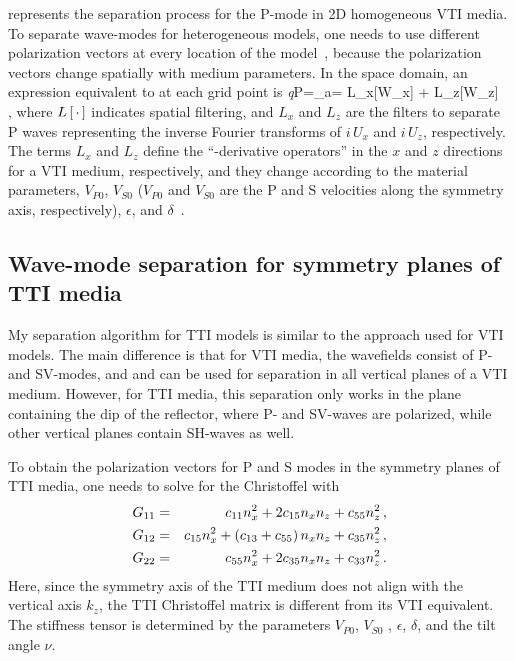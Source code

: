  represents the separation process for the 
P-mode in 2D homogeneous VTI media. To separate wave-modes for
heterogeneous models, one needs to use different polarization vectors at every
location of the model~\cite[]{yan:WB19}, because the polarization
vectors change spatially with medium parameters.  In the space domain,
an expression equivalent to  at each grid point is
\beq\label{AniDivX}
{\it q}P=\nabla_a\cdot \WW     = L_x[W_x] + L_z[W_z] \, ,
\eeq
where $L\left [\,\cdot\,\right]$ indicates spatial filtering, and $L_x$ and $L_z$
are the filters to separate P waves representing the inverse Fourier
transforms of $i\, U_x$ and $i\, U_z$, respectively. The terms $L_x$
and $L_z$ define the ``\cool-derivative operators'' in the $x$ and $z$
directions for a VTI medium, respectively, and they change according to the material
parameters, $V_{P0}$, $V_{S0}$ ($V_{P0}$ and $V_{S0}$ are the P and S
velocities along the symmetry axis, respectively), $\epsilon$, and
$\delta$~\cite[]{thomsen:1954}.

\subsection{Wave-mode separation for symmetry planes of TTI media}
My separation algorithm for TTI models is similar to the approach
used for VTI models.  The main difference is that for VTI media, the
wavefields consist of P- and SV-modes, and 
and  can be used for separation in all vertical planes of
a VTI medium. However, for TTI media, this separation only works in
the plane containing the dip of the reflector, where P- and SV-waves are
polarized, while other vertical planes contain SH-waves as well.


To obtain the polarization vectors for P and S modes in the symmetry
planes of TTI media, one needs to solve for the Christoffel 
with 
\begin{eqnarray}
G_{11}&=&c_{11} n_x^2 +2c_{15}n_xn_z+c_{55} n_z^2 \, ,\\
G_{12}&=&c_{15} n_x^2+\left ( c_{13}+c_{55}\right) n_xn_z+c_{35} n_z^2\, ,\\
G_{22}&=&c_{55} n_x^2 +2c_{35}n_xn_z+c_{33} n_z^2\, .
\end{eqnarray}
Here, since the symmetry axis of the TTI medium does not align with
the vertical axis $k_z$, the TTI Christoffel matrix is different from
its VTI equivalent. The stiffness tensor is determined by the
parameters $V_{P0}$, $V_{S0}$ , $\epsilon$, $\delta$, and the tilt angle
$\nu$.


